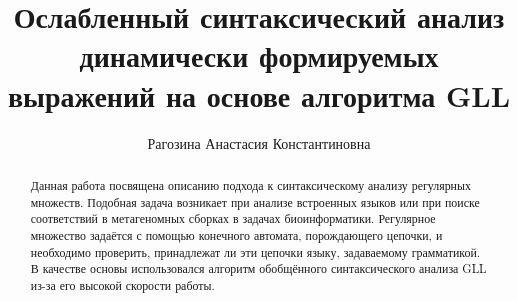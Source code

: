 \title{Ослабленный синтаксический анализ динамически формируемых выражений на основе алгоритма GLL}


\author{Рагозина Анастасия Константиновна}



\maketitle             

\begin{abstract}
Данная работа посвящена описанию подхода к синтаксическому анализу регулярных множеств. 
Подобная задача возникает при анализе встроенных языков или при поиске соответствий в 
метагеномных сборках в задачах биоинформатики. Регулярное множество задаётся с помощью 
конечного автомата, порождающего цепочки, и необходимо проверить, принадлежат ли эти цепочки 
языку, задаваемому грамматикой. В качестве основы использовался алгоритм обобщённого 
синтаксического анализа GLL из-за его высокой скорости работы.
\end{abstract}









